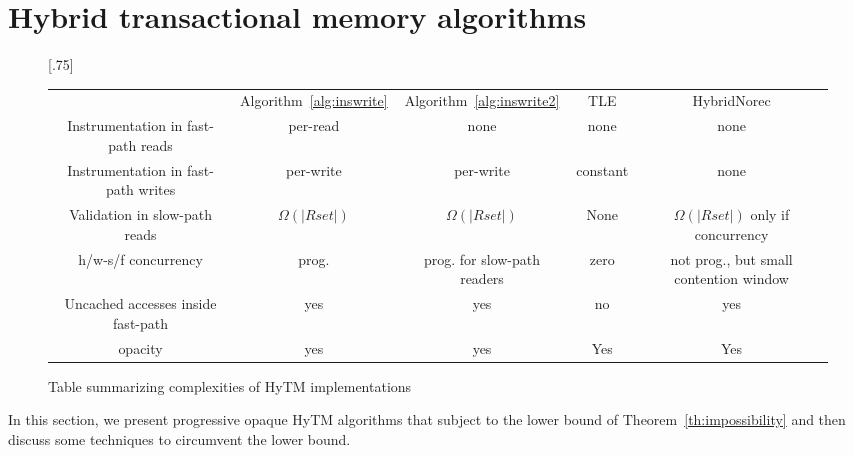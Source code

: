 \section{Hybrid transactional memory algorithms}\label{sec:hytmalgos}
%
\begin{figure*}[!ht]
      
     \scalebox{.75}[.75]{
     \begin{tabularx}{\textwidth}{c|c|c|c|c}
	~~~~~ & Algorithm~\ref{alg:inswrite} & Algorithm~\ref{alg:inswrite2} & TLE & HybridNorec\\ 
	Instrumentation in fast-path reads & per-read & none & none & none \\ 
	Instrumentation in fast-path writes & per-write & per-write & constant & none \\ 
	Validation in slow-path reads & $\Omega(|Rset|)$ & $\Omega(|Rset|)$ & None & $\Omega(|Rset|)$ only if concurrency \\ 
	h/w-s/f concurrency & prog. & prog. for slow-path readers & zero & not prog., but small contention window \\ 
	Uncached accesses inside fast-path & yes & yes & no & yes \\ 
	opacity & yes & yes & Yes & Yes 
   \end{tabularx}
\caption{Table summarizing complexities of HyTM implementations}\label{fig:main}    
}
\end{figure*}
%
In this section, we present progressive opaque HyTM algorithms that subject to the lower bound
of Theorem~\ref{th:impossibility} and then discuss some techniques to circumvent the lower bound.
%

%
%